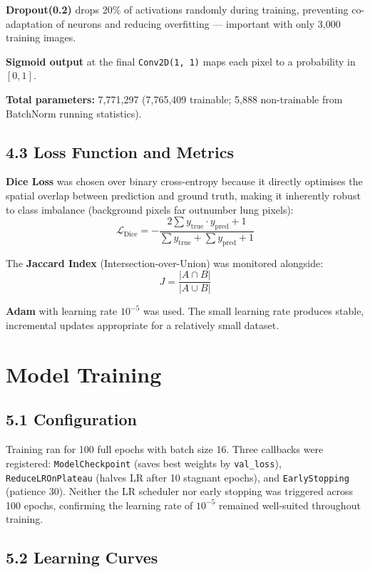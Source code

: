 \documentclass[12pt,a4paper]{article}
\begin{document}
\textbf{Dropout(0.2)} drops 20\% of activations randomly during training,
preventing co-adaptation of neurons and reducing overfitting --- important
with only 3,000 training images.

\textbf{Sigmoid output} at the final \texttt{Conv2D(1, 1)} maps each pixel
to a probability in $[0, 1]$.

\textbf{Total parameters:} 7,771,297 (7,765,409 trainable; 5,888 non-trainable
from BatchNorm running statistics).

\subsection*{4.3 Loss Function and Metrics}

\textbf{Dice Loss} was chosen over binary cross-entropy because it directly
optimises the spatial overlap between prediction and ground truth, making it
inherently robust to class imbalance (background pixels far outnumber lung pixels):
\[
  \mathcal{L}_{\text{Dice}} = -\frac{2 \sum y_{\text{true}} \cdot y_{\text{pred}}
  + 1}{\sum y_{\text{true}} + \sum y_{\text{pred}} + 1}
\]

The \textbf{Jaccard Index} (Intersection-over-Union) was monitored alongside:
\[
  J = \frac{|A \cap B|}{|A \cup B|}
\]

\textbf{Adam} with learning rate $10^{-5}$ was used. The small learning rate
produces stable, incremental updates appropriate for a relatively small dataset.

\section{Model Training}

\subsection*{5.1 Configuration}

Training ran for 100 full epochs with batch size 16. Three callbacks were
registered: \texttt{ModelCheckpoint} (saves best weights by \texttt{val\_loss}),
\texttt{ReduceLROnPlateau} (halves LR after 10 stagnant epochs), and
\texttt{EarlyStopping} (patience 30). Neither the LR scheduler nor early stopping
was triggered across 100 epochs, confirming the learning rate of $10^{-5}$
remained well-suited throughout training.

\subsection*{5.2 Learning Curves}
\end{document}
